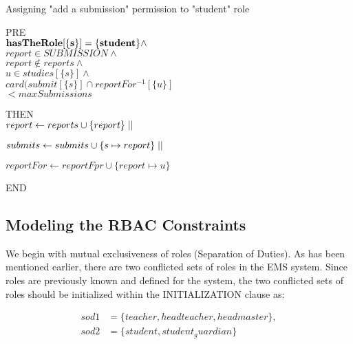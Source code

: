 \begin{algorithm}                      %
\caption{Assigning "add a submission" permission to "student" role}          %
\label{alg1}                          


PRE \\

\quad ${\bf hasTheRole[\{s\}] = \{student\}} \wedge$\\
 
\quad $report \in SUBMISSION \wedge$ \\

\quad $report \notin reports \wedge$ \\

\quad $u \in studies [\{s\}] \wedge$ \\

\quad $card(submit[\{s\}] \cap reportFor^{-1} [\{u\}]$ \\

\quad $< maxSubmissions$
 


THEN \\ 

\quad $report \gets reports \cup \{report\} \mid\mid \\$

\quad $submits \gets submits \cup \{s \mapsto report\} \mid\mid \\$

\quad $reportFor \gets reportFpr \cup \{report \mapsto u\}$
 

END
\end{algorithm} 


\subsection{Modeling the RBAC Constraints}

     We begin with mutual exclusiveness of roles  (Separation of Duties).  As has been mentioned earlier, there are two conflicted sets of roles in the EMS system.  Since roles are previously known and defined for the system, the two conflicted sets of roles should be initialized within the INITIALIZATION clause as:

\begin{align*}
sod1 &= \{teacher, headteacher, headmaster\}, \\
sod2 &= \{student, student_guardian\}
\end{align*}

